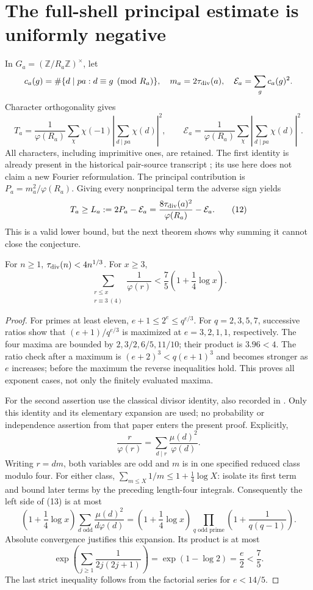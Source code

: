 \section{The full-shell principal estimate is uniformly negative}
In $G_a=(\mathbb Z/R_a\mathbb Z)^\times$, let
\[
 c_a(g)=\#\{d\mid pa:d\equiv g\pmod{R_a}\},\quad
 m_a=2\tau_{\rm div}(a),\quad \mathcal E_a=\sum_g c_a(g)^2.
\]
Character orthogonality gives
\[
 T_a=\frac1{\varphi(R_a)}\sum_\chi\chi(-1)
             \left|\sum_{d\mid pa}\chi(d)\right|^2,
 \qquad
 \mathcal E_a=\frac1{\varphi(R_a)}\sum_\chi
             \left|\sum_{d\mid pa}\chi(d)\right|^2.       \tag{11}
\]
All characters, including imprimitive ones, are retained. The first identity is
already present in the historical pair-source transcript \cite{Boolean}; its
use here does not claim a new Fourier reformulation. The principal contribution
is $P_a=m_a^2/\varphi(R_a)$. Giving every nonprincipal term the adverse sign yields
\[
 T_a\ge L_a:=2P_a-\mathcal E_a
 =\frac{8\tau_{\rm div}(a)^2}{\varphi(R_a)}-\mathcal E_a. \tag{12}
\]
This is a valid lower bound, but the next theorem shows why summing it cannot
close the conjecture.

\begin{lemma}\label{lem:elementary}
For $n\ge1$, $\tau_{\rm div}(n)<4n^{1/3}$. For $x\ge3$,
\[
 \sum_{\substack{r\le x\\r\equiv3\ (4)}}\frac1{\varphi(r)}
 <\frac75\left(1+\frac14\log x\right).                  \tag{13}
\]
\end{lemma}
\begin{proof}
For primes at least eleven, $e+1\le2^e\le q^{e/3}$. For $q=2,3,5,7$, successive
ratios show that $(e+1)/q^{e/3}$ is maximized at $e=3,2,1,1$, respectively.
The four maxima are bounded by $2,3/2,6/5,11/10$; their product is $3.96<4$.
The ratio check after a maximum is $(e+2)^3<q(e+1)^3$ and becomes stronger as
$e$ increases; before the maximum the reverse inequalities hold. This proves
all exponent cases, not only the finitely evaluated maxima.

For the second assertion use the classical divisor identity, also recorded in
\cite[Lemmas 8--10, pp. 11--12]{Farah}. Only this identity and its elementary
expansion are used; no probability or independence assertion from that paper
enters the present proof. Explicitly,
\[
 \frac r{\varphi(r)}=\sum_{d\mid r}\frac{\mu(d)^2}{\varphi(d)}.
\]
Writing $r=dm$, both variables are odd and $m$ is in one specified reduced class
modulo four. For either class,
$\sum_{m\le X}1/m\le1+\frac14\log X$: isolate its first term and bound later
terms by the preceding length-four integrals. Consequently the left side of
(13) is at most
\[
 \left(1+\frac14\log x\right)
 \sum_{d\text{ odd}}\frac{\mu(d)^2}{d\varphi(d)}
 =\left(1+\frac14\log x\right)
 \prod_{q\text{ odd prime}}\left(1+\frac1{q(q-1)}\right).
\]
Absolute convergence justifies this expansion. Its product is at most
\[
 \exp\left(\sum_{j\ge1}\frac1{2j(2j+1)}\right)
 =\exp(1-\log2)=\frac e2<\frac75.
\]
The last strict inequality follows from the factorial series for $e<14/5$.
\end{proof}

